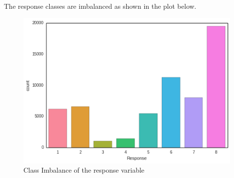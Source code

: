 The response classes are imbalanced as shown in the plot below.

\begin{figure}[hbtp]
\caption{Class Imbalance of the response variable}
\centering
\includegraphics[scale=0.5]{classimbalance.png}
\end{figure}

